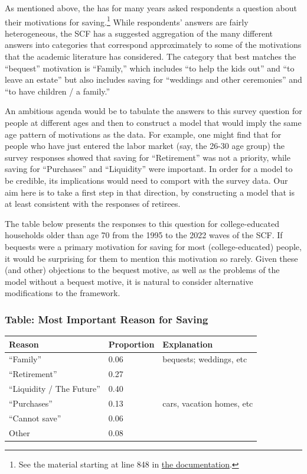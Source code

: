 \documentclass{article}
\begin{document}
As mentioned above, the \cite{2023} has for many years asked respondents a question about their motivations for saving.\footnote{See the material starting at line 848 in \href{https://www.federalreserve.gov/econres/files/bulletin.macro.txt}{the documentation}.}
While respondents' answers are fairly heterogeneous, the SCF has a suggested aggregation of the many different answers into categories that correspond approximately to some of the motivations that the academic literature has considered.
The category that best matches the ``bequest'' motivation is ``Family,'' which includes ``to help the kids out'' and ``to leave an estate'' but also includes saving for ``weddings and other ceremonies'' and ``to have children / a family.''

An ambitious agenda would be to tabulate the answers to this survey question for people at different ages and then to construct a model that would imply the same age pattern of motivations as the data.
For example, one might find that for people who have just entered the labor market (say, the 26-30 age group) the survey responses showed that saving for ``Retirement'' was not a priority, while saving for ``Purchases'' and ``Liquidity'' were important.
In order for a model to be credible, its implications would need to comport with the survey data.
Our aim here is to take a first step in that direction, by constructing a model that is at least consistent with the responses of retirees.

The table below presents the responses to this question for college-educated households older than age 70 from the 1995 to the 2022 waves of the SCF.
If bequests were a primary motivation for saving for most (college-educated) people, it would be surprising for them to mention this motivation so rarely.
Given these (and other) objections to the bequest motive, as well as the problems of the model without a bequest motive, it is natural to consider alternative modifications to the framework.

\subsubsection{Table: Most Important Reason for Saving}\label{most-important-reason}

\bigskip\noindent
\begin{tabular}{p{}p{}p{}}
\toprule
Reason & Proportion & Explanation \\
\hline
``Family'' & 0.06 & bequests; weddings, etc \\
``Retirement'' & 0.27 &  \\
``Liquidity / The Future'' & 0.40 &  \\
``Purchases'' & 0.13 & cars, vacation homes, etc \\
``Cannot save'' & 0.06 &  \\
Other & 0.08 &  \\
\bottomrule
\end{tabular}
\end{document}
